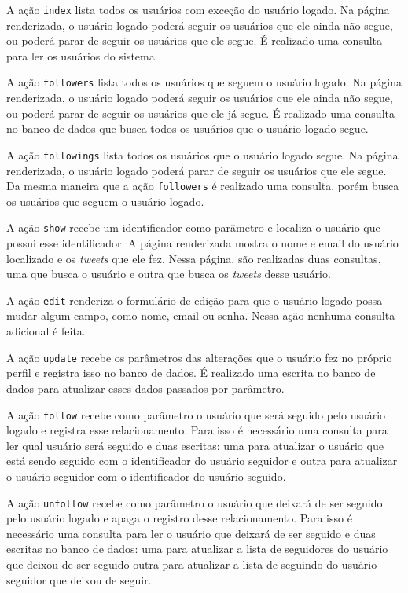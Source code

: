 A ação \verb|index| lista todos os usuários com exceção do usuário logado. Na página renderizada, o usuário logado poderá seguir os usuários que ele ainda não segue, ou poderá parar de seguir os usuários que ele segue. É realizado uma consulta para ler os usuários do sistema.

A ação \verb|followers| lista todos os usuários que seguem o usuário logado. Na página renderizada, o usuário logado poderá seguir os usuários que ele ainda não segue, ou poderá parar de seguir os usuários que ele já segue. É realizado uma consulta no banco de dados que busca todos os usuários que o usuário logado segue.

A ação \verb|followings| lista todos os usuários que o usuário logado segue. Na página renderizada, o usuário logado poderá parar de seguir os usuários que ele segue. Da mesma maneira que a ação \verb|followers| é realizado uma consulta, porém busca os usuários que seguem o usuário logado.

A ação \verb|show| recebe um identificador como parâmetro e localiza o usuário que possui esse identificador. A página renderizada mostra o nome e email do usuário localizado e os \textit{tweets} que ele fez. Nessa página, são realizadas duas consultas, uma que busca o usuário e outra que busca os \textit{tweets} desse usuário.

A ação \verb|edit| renderiza o formulário de edição para que o usuário logado possa mudar algum campo, como nome, email ou senha. Nessa ação nenhuma consulta adicional é feita.

A ação \verb|update| recebe os parâmetros das alterações que o usuário fez no próprio perfil e registra isso no banco de dados. É realizado uma escrita no banco de dados para atualizar esses dados passados por parâmetro.

A ação \verb|follow| recebe como parâmetro o usuário que será seguido pelo usuário logado e registra esse relacionamento. Para isso é necessário uma consulta para ler qual usuário será seguido e duas escritas: uma para atualizar o usuário que está sendo seguido com o identificador do usuário seguidor e outra para atualizar o usuário seguidor com o identificador do usuário seguido.

A ação \verb|unfollow| recebe como parâmetro o usuário que deixará de ser seguido pelo usuário logado e apaga o registro desse relacionamento. Para isso é necessário uma consulta para ler o usuário que deixará de ser seguido e duas escritas no banco de dados: uma para atualizar a lista de seguidores do usuário que deixou de ser seguido outra para atualizar a lista de seguindo do usuário seguidor que deixou de seguir.

